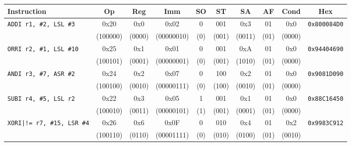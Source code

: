 \begin{table}[H]
	\centering
	\footnotesize
	\setlength{\tabcolsep}{2.5pt}
	\begin{tabular}{lccccccccc}
		\toprule
		\textbf{Instruction}               & \textbf{Op} & \textbf{Reg} & \textbf{Imm} & \textbf{SO} & \textbf{ST} & \textbf{SA} & \textbf{AF} & \textbf{Cond} & \textbf{Hex}        \\
		\midrule
		\texttt{ADDI r1, \#2, LSL \#3}     & 0x20        & 0x0          & 0x02         & 0           & 001         & 0x3         & 01          & 0x0           & \texttt{0x800084D0} \\
		                                   & (100000)    & (0000)       & (00000010)   & (0)         & (001)       & (0011)      & (01)        & (0000)        &                     \\
		\midrule
		\texttt{ORRI r2, \#1, LSL \#10}    & 0x25        & 0x1          & 0x01         & 0           & 001         & 0xA         & 01          & 0x0           & \texttt{0x94404690} \\
		                                   & (100101)    & (0001)       & (00000001)   & (0)         & (001)       & (1010)      & (01)        & (0000)        &                     \\
		\midrule
		\texttt{ANDI r3, \#7, ASR \#2}     & 0x24        & 0x2          & 0x07         & 0           & 100         & 0x2         & 01          & 0x0           & \texttt{0x9081D090} \\
		                                   & (100100)    & (0010)       & (00000111)   & (0)         & (100)       & (0010)      & (01)        & (0000)        &                     \\
		\midrule
		\texttt{SUBI r4, \#5, LSL r2}      & 0x22        & 0x3          & 0x05         & 1           & 001         & 0x1         & 01          & 0x0           & \texttt{0x88C16450} \\
		                                   & (100010)    & (0011)       & (00000101)   & (1)         & (001)       & (0001)      & (01)        & (0000)        &                     \\
		\midrule
		\texttt{XORI|!= r7, \#15, LSR \#4} & 0x26        & 0x6          & 0x0F         & 0           & 010         & 0x4         & 01          & 0x2           & \texttt{0x9983C912} \\
		                                   & (100110)    & (0110)       & (00001111)   & (0)         & (010)       & (0100)      & (01)        & (0010)        &                     \\

\end{tabular}
\end{table}
